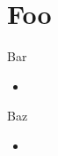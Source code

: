\section*{Foo}

\begin{frame}{Bar}
    \begin{itemize}
        \item \lipsum[3]
    \end{itemize}
\end{frame}

\begin{frame}{Baz}
    \begin{itemize}
        \item \lipsum[3]
    \end{itemize}
\end{frame}
